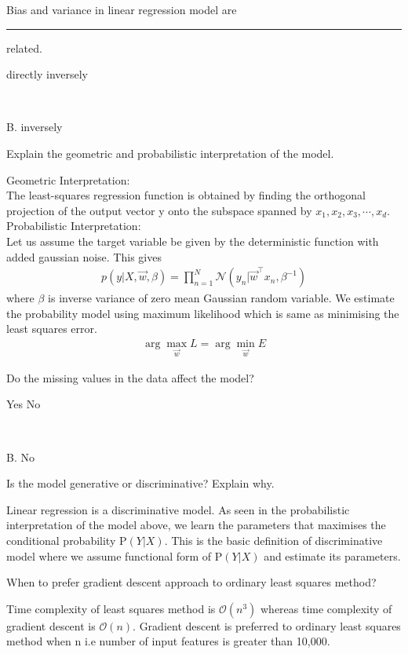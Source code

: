 \documentclass[12pt,letterpaper, onecolumn]{exam}
\begin{document}
\begin{questions}
\question[] Bias and variance in linear regression model are \rule{2cm}{0.15mm} related.\\
\begin{oneparchoices}
    \choice directly
    \choice inversely
  \end{oneparchoices} \\
  \begin{Solution}
  B. inversely
  \end{Solution}
  \question[] Explain the geometric and probabilistic interpretation of the model.\\
  \begin{Solution}
  Geometric Interpretation:\\
  The least-squares regression function is obtained by finding the orthogonal projection of the output vector y onto the subspace spanned by ${x_1,x_2,x_3,\cdots,x_d }$.\\
  Probabilistic Interpretation:\\
  Let us assume the target variable be given by the deterministic function with added gaussian noise. This gives
  \begin{align}
  p(y|X, \vec{w}, \beta) = \prod_{n=1}^N \mathcal{N}(y_n|\vec{w}^\top x_n,\beta^{-1})
  \end{align}
  where $\beta$ is inverse variance of zero mean Gaussian random variable. We estimate the probability model using maximum likelihood which is same as minimising the least squares error.
  \begin{align}
  \arg \max_{\vec{w}} L = \arg \min_{\vec{w}} E
  \end{align}
  \end{Solution}
  \question[] Do the missing values in the data affect the model?\\
  \begin{oneparchoices}
    \choice Yes
    \choice No
  \end{oneparchoices} \\
  \begin{Solution}
  B. No
  \end{Solution}
  \question[] Is the model generative or discriminative? Explain why.
  \\
  \begin{Solution}
  Linear regression is a discriminative model. As seen in the probabilistic interpretation of the model above, we learn the parameters that maximises the conditional probability P$(Y|X)$. This is the basic definition of discriminative model where we assume functional form of P$(Y|X)$ and estimate its parameters. 
  \end{Solution}
  \question[] When to prefer gradient descent approach to ordinary least squares method?\\
  \begin{Solution}
  Time complexity of least squares method is $\mathcal{O}(n^3)$ whereas time complexity of gradient descent is $\mathcal{O}(n)$.
  Gradient descent is preferred to ordinary least squares method when n i.e number of input features is greater than 10,000.
  

\end{Solution}
\end{questions}
\end{document}
